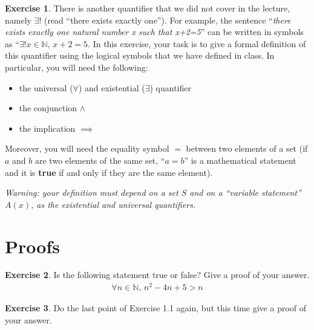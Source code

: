 \documentclass[a4paper,oneside]{article}
\theoremstyle{definition} \newtheorem{exercise}{Exercise}[section]
\begin{document}
\begin{exercise}
  There is another quantifier that we did not cover in the lecture, namely
  $\exists!$ (read ``there exists exactly one''). For example, the sentence
  ``\emph{there exists exactly one natural number x such that x+2=5}'' can be
  written in symbols as ``$\exists!x\in \mathbb N,\,x+2=5$.
  In this exercise, your task is to give a formal definition of this quantifier
  using the logical symbols that we have defined in class. In particular, you
  will need the following:
  \begin{itemize}
    \item the universal ($\forall$) and existential ($\exists$) quantifier
    \item the conjunction $\land$
    \item the implication $\implies$
  \end{itemize}
  Moreover, you will need the equality symbol $=$ between two elements of a set
  (if $a$ and $b$ are two elements of the same set, ``$a=b$'' is a mathematical
  statement and it is \textbf{true} if and only if they are the same element).
  
  \emph{Warning: your definition must depend on a set $S$ and on a ``variable
  statement'' $A(x)$, as the existential and universal quantifiers.}
\end{exercise}

\section{Proofs}

\begin{exercise}
  Is the following statement true or false? Give a proof of your answer.
  \begin{align*}
    \forall n\in \mathbb N,\, n^2 -4n +5>n
  \end{align*}
\end{exercise}

\begin{exercise}
  Do the last point of Exercise 1.1 again, but this time give a proof of your
  answer.
\end{exercise}
\end{document}
